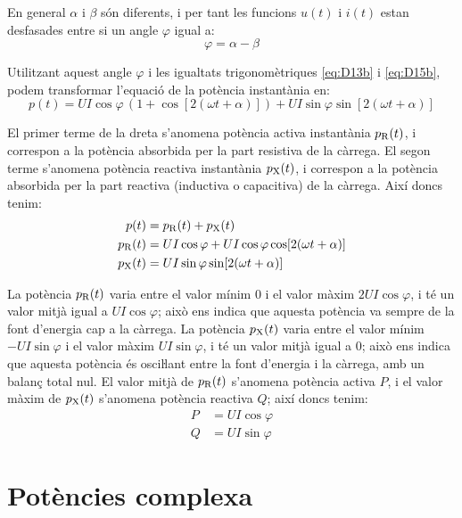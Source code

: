 En general $\alpha$ i $\beta$ són diferents, i per tant les funcions $u(t)$ i $i(t)$ estan desfasades entre si un angle $\varphi$ igual a:
\begin{equation}
  \varphi = \alpha - \beta
\end{equation}

Utilitzant aquest angle $\varphi$ i les igualtats trigonomètriques \eqref{eq:D13b} i \eqref{eq:D15b}, podem transformar l'equació de la potència instantània en:
\begin{equation}
   p(t) = U I \cos\varphi \,(1 + \cos [2 (\omega t + \alpha)]) + U I \sin\varphi \sin[2 (\omega t + \alpha)]
\end{equation}

El primer terme de la dreta  s'anomena potència activa instantània $p_\mathrm{R}(t)$, i correspon a la potència absorbida per la part resistiva de la càrrega. El segon terme  s'anomena potència reactiva instantània $p_\mathrm{X}(t)$, i correspon a la potència absorbida per la part reactiva (inductiva o capacitiva) de la càrrega. Així doncs tenim:
\begin{align}
  p(t) &= p_\mathrm{R}(t) + p_\mathrm{X}(t) \\
  p_\mathrm{R}(t) &=  U I \cos\varphi + U I \cos\varphi \cos [2 (\omega t + \alpha)] \\
  p_\mathrm{X}(t) &=  U I \sin\varphi \sin[2 (\omega t + \alpha)]
\end{align}

La potència $p_\mathrm{R}(t)$ varia entre el valor mínim 0 i el valor màxim $2 U I \cos\varphi$, i té un valor mitjà igual a $U I \cos\varphi$; això ens indica que aquesta potència va sempre de la font d'energia cap a la càrrega. La potència $p_\mathrm{X}(t)$ varia entre el valor mínim $-U I \sin\varphi$ i el valor  màxim $U I \sin\varphi$, i té un valor mitjà igual a 0; això ens indica que aquesta potència és osciŀlant entre la font d'energia i la càrrega, amb un balanç total nul. El valor mitjà de $p_\mathrm{R}(t)$ s'anomena potència activa $P$, i el valor màxim de $p_\mathrm{X}(t)$ s'anomena potència reactiva $Q$; així doncs tenim:
\begin{align}
  P &= U I \cos\varphi \\
  Q &= U I \sin\varphi
\end{align}

\section{Potències  complexa}\label{sec:pot_complex} 


